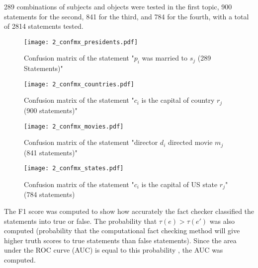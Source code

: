 \documentclass[10pt,11pt,12pt,oneside]{book}
\begin{document}
289 combinations of subjects and objects were tested in the first topic, 900 statements for the second, 841 for the third, and 784 for the fourth, with a total of 2814 statements tested.

\begin{figure}[H]
	\begin{center}
		\texttt{[image: 2\_confmx\_presidents.pdf]}\\
		\caption{Confusion matrix of the statement "$ p_{i} $ was married to $ s_{j} $ (289 Statements)"}
	\end{center}
\end{figure}

\begin{figure}[H]
	\begin{center}
		\texttt{[image: 2\_confmx\_countries.pdf]}\\
		\caption{Confusion matrix of the statement "$ c_{i} $ is the capital of country $ r_{j} $ (900 statements)"}
	\end{center}
\end{figure}

\begin{figure}[H]
	\begin{center}
		\texttt{[image: 2\_confmx\_movies.pdf]}\\
		\caption{Confusion matrix of the statement "director $ d_{i} $ directed movie $ m_{j}$ (841 statements)"}
		\label{2_confmx_movies}
	\end{center}
\end{figure}

\begin{figure}[H]
	\begin{center}
		\texttt{[image: 2\_confmx\_states.pdf]}\\
		\caption{Confusion matrix of the statement "$ c_{i} $ is the capital of US state $ r_{j} $" (784 statements)}
	\end{center}
\end{figure}


The F1 score was computed to show how accurately the fact checker classified the statements into true or false. The probability that $ \tau (e) > \tau (e \prime) $ was also computed (probability that the computational fact checking method will give higher truth scores to true statements than false statements). Since the area under the ROC curve (AUC) is equal to this probability \cite{Fawcett2006}, the AUC was computed.\\
\end{document}

